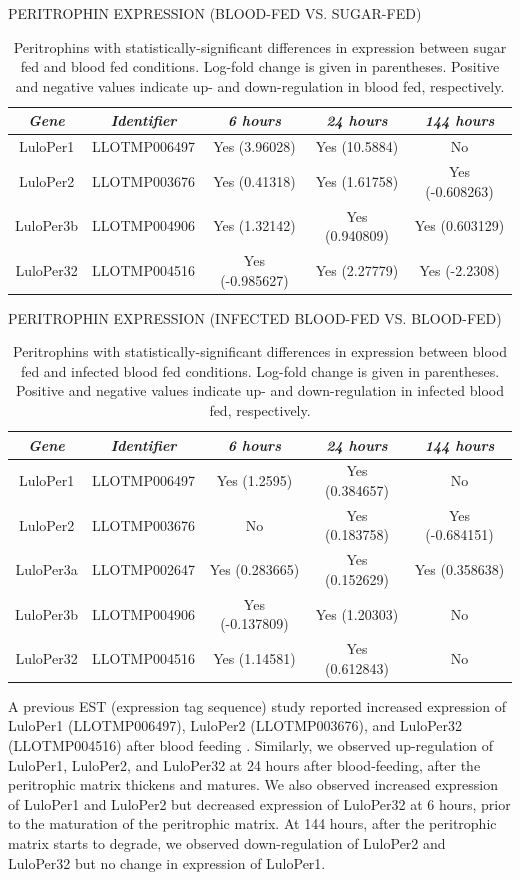\begin{table}[H]
  \centering
  \caption{PERITROPHIN EXPRESSION (BLOOD-FED VS. SUGAR-FED)}
  \begin{tabular}{ c c c c c } \hline
    \emph{Gene} & \emph{Identifier} & \emph{6 hours} & \emph{24 hours} & \emph{144 hours} \\ \hline
    LuloPer1 & LLOTMP006497 & Yes (3.96028) & Yes (10.5884) & No \\
    LuloPer2 & LLOTMP003676 & Yes (0.41318) & Yes (1.61758) & Yes (-0.608263) \\
    LuloPer3b & LLOTMP004906 & Yes (1.32142) & Yes (0.940809) & Yes (0.603129) \\
    LuloPer32 & LLOTMP004516 & Yes (-0.985627) & Yes (2.27779) & Yes (-2.2308)
  \end{tabular}
  \caption*{Peritrophins with statistically-significant differences in expression between sugar fed and blood fed conditions. Log-fold change is given in parentheses. Positive and negative values indicate up- and down-regulation in blood fed, respectively.}
  \label{tab:sandflies:stat-sig-peritrophins-sb}
\end{table}

\begin{table}[H]
  \centering
  \caption{PERITROPHIN EXPRESSION (INFECTED BLOOD-FED VS. BLOOD-FED)}
  \begin{tabular}{ c c c c c } \hline
    \emph{Gene} & \emph{Identifier} & \emph{6 hours} & \emph{24 hours} & \emph{144 hours} \\ \hline
    LuloPer1 & LLOTMP006497 & Yes (1.2595) & Yes (0.384657) & No \\
    LuloPer2 & LLOTMP003676 & No & Yes (0.183758) & Yes (-0.684151) \\
    LuloPer3a & LLOTMP002647 & Yes (0.283665) & Yes (0.152629) & Yes (0.358638) \\
    LuloPer3b & LLOTMP004906 & Yes (-0.137809) & Yes (1.20303) & No \\
    LuloPer32 & LLOTMP004516 & Yes (1.14581) & Yes (0.612843) & No
  \end{tabular}
  \caption*{Peritrophins with statistically-significant differences in expression between blood fed and infected blood fed conditions. Log-fold change is given in parentheses. Positive and negative values indicate up- and down-regulation in infected blood fed, respectively.}
  \label{tab:sandflies:stat-sig-peritrophins-bi}
\end{table}

A previous EST (expression tag sequence) study reported increased expression of LuloPer1 (LLOTMP006497), LuloPer2 (LLOTMP003676), and LuloPer32 (LLOTMP004516) after blood feeding \cite{Jochim2008}. Similarly, we observed up-regulation of LuloPer1, LuloPer2, and LuloPer32 at 24 hours after blood-feeding, after the peritrophic matrix thickens and matures.  We also observed increased expression of LuloPer1 and LuloPer2 but decreased expression of LuloPer32 at 6 hours, prior to the maturation of the peritrophic matrix. At 144 hours, after the peritrophic matrix starts to degrade, we observed down-regulation of LuloPer2 and LuloPer32 but no change in expression of LuloPer1.

